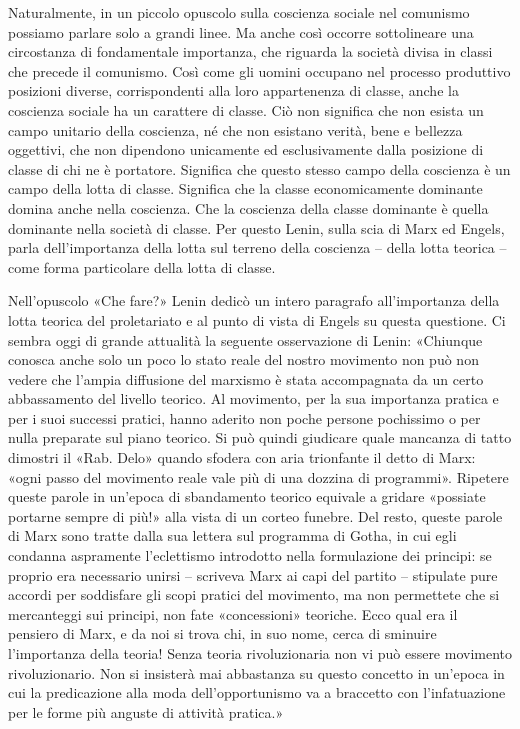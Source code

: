 \documentclass[../main]{subfiles}
\begin{document}
Naturalmente, in un piccolo opuscolo sulla coscienza sociale nel comunismo possiamo parlare solo a grandi linee. Ma anche così occorre sottolineare una circostanza di fondamentale importanza, che riguarda la società divisa in classi che precede il comunismo. Così come gli uomini occupano nel processo produttivo posizioni diverse, corrispondenti alla loro appartenenza di classe, anche la coscienza sociale ha un carattere di classe. Ciò non significa che non esista un campo unitario della coscienza, né che non esistano verità, bene e bellezza oggettivi, che non dipendono unicamente ed esclusivamente dalla posizione di classe di chi ne è portatore. Significa che questo stesso campo della coscienza è un campo della lotta di classe. Significa che la classe economicamente dominante domina anche nella coscienza. Che la coscienza della classe dominante è quella dominante nella società di classe. Per questo Lenin, sulla scia di Marx ed Engels, parla dell'importanza della lotta sul terreno della coscienza – della lotta teorica – come forma particolare della lotta di classe.

Nell'opuscolo «Che fare?» Lenin dedicò un intero paragrafo all'importanza della lotta teorica del proletariato e al punto di vista di Engels su questa questione. Ci sembra oggi di grande attualità la seguente osservazione di Lenin: «Chiunque conosca anche solo un poco lo stato reale del nostro movimento non può non vedere che l'ampia diffusione del marxismo è stata accompagnata da un certo abbassamento del livello teorico. Al movimento, per la sua importanza pratica e per i suoi successi pratici, hanno aderito non poche persone pochissimo o per nulla preparate sul piano teorico. Si può quindi giudicare quale mancanza di tatto dimostri il «Rab. Delo» quando sfodera con aria trionfante il detto di Marx: «ogni passo del movimento reale vale più di una dozzina di programmi». Ripetere queste parole in un'epoca di sbandamento teorico equivale a gridare «possiate portarne sempre di più!» alla vista di un corteo funebre. Del resto, queste parole di Marx sono tratte dalla sua lettera sul programma di Gotha, in cui egli condanna aspramente l'eclettismo introdotto nella formulazione dei principi: se proprio era necessario unirsi – scriveva Marx ai capi del partito – stipulate pure accordi per soddisfare gli scopi pratici del movimento, ma non permettete che si mercanteggi sui principi, non fate «concessioni» teoriche. Ecco qual era il pensiero di Marx, e da noi si trova chi, in suo nome, cerca di sminuire l'importanza della teoria! Senza teoria rivoluzionaria non vi può essere movimento rivoluzionario. Non si insisterà mai abbastanza su questo concetto in un'epoca in cui la predicazione alla moda dell'opportunismo va a braccetto con l'infatuazione per le forme più anguste di attività pratica.»
\end{document}
